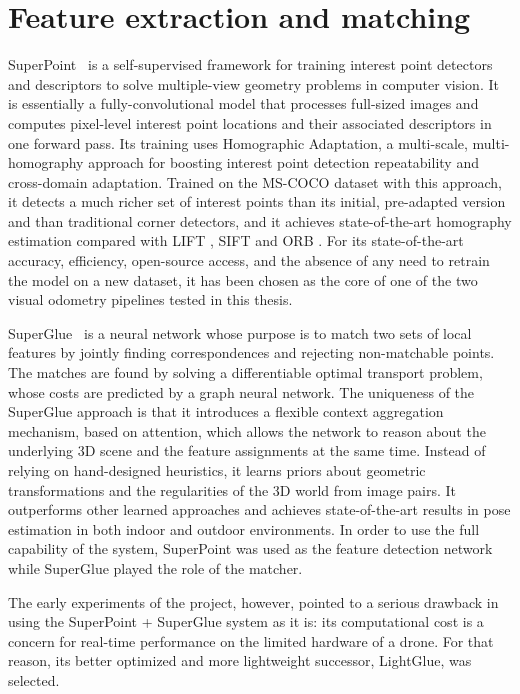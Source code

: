 \documentclass[english, Lau, oneside]{sapthesis}%
\begin{document}
\section{Feature extraction and matching}
\label{sec:bg-features}
SuperPoint~\citep{detone2018superpoint} is a self-supervised framework for training interest point detectors and descriptors to solve multiple-view geometry problems in computer vision. It is essentially a fully-convolutional model that processes full-sized images and computes pixel-level interest point locations and their associated descriptors in one forward pass. Its training uses Homographic Adaptation, a multi-scale, multi-homography approach for boosting interest point detection repeatability and cross-domain adaptation. Trained on the MS-COCO dataset \citep{lin2014coco} with this approach, it detects a much richer set of interest points than its initial, pre-adapted version and than traditional corner detectors, and it achieves state-of-the-art homography estimation compared with LIFT \citep{yi2016lift}, SIFT \citep{lowe2004sift} and ORB \citep{rublee2011orb}. For its state-of-the-art accuracy, efficiency, open-source access, and the absence of any need to retrain the model on a new dataset, it has been chosen as the core of one of the two visual odometry pipelines tested in this thesis.

SuperGlue~\citep{sarlin2020superglue} is a neural network whose purpose is to match two sets of local features by jointly finding correspondences and rejecting non-matchable points. The matches are found by solving a differentiable optimal transport problem, whose costs are predicted by a graph neural network. The uniqueness of the SuperGlue approach is that it introduces a flexible context aggregation mechanism, based on attention, which allows the network to reason about the underlying 3D scene and the feature assignments at the same time. Instead of relying on hand-designed heuristics, it learns priors about geometric transformations and the regularities of the 3D world from image pairs. It outperforms other learned approaches and achieves state-of-the-art results in pose estimation in both indoor and outdoor environments. In order to use the full capability of the system, SuperPoint was used as the feature detection network while SuperGlue played the role of the matcher.

The early experiments of the project, however, pointed to a serious drawback in using the SuperPoint + SuperGlue system as it is: its computational cost is a concern for real-time performance on the limited hardware of a drone. For that reason, its better optimized and more lightweight successor, LightGlue, was selected.
\end{document}
